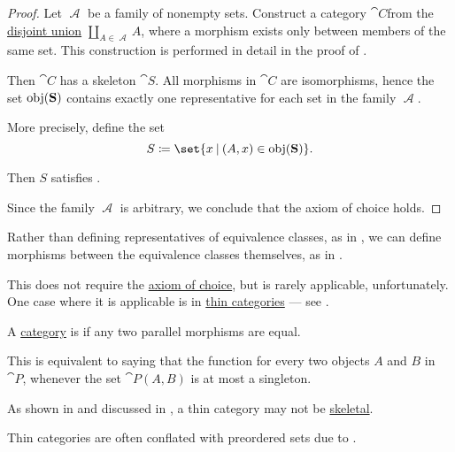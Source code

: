 \begin{proof}
  Let \( \mscrA \) be a family of nonempty sets. Construct a category \( \cat{C} \)from the \hyperref[def:disjoint_union]{disjoint union} \( \coprod_{A \in \mscrA} A \), where a morphism exists only between members of the same set. This construction is performed in detail in the proof of .

  Then \( \cat{C} \) has a skeleton \( \cat{S} \). All morphisms in \( \cat{C} \) are isomorphisms, hence the set \( \operatorname{obj}(\operatorname{\mathbf{S}}) \) contains exactly one representative for each set in the family \( \mscrA \).

  More precisely, define the set
  \begin{equation*}
    S \coloneqq \set{ x \given (A, x) \in \obj(\cat{S}) }.
  \end{equation*}

  Then \( S \) satisfies .

  Since the family \( \mscrA \) is arbitrary, we conclude that the axiom of choice holds.
\end{proof}

\begin{remark}\label{rem:skeletons_and_thin_categories}
  Rather than defining representatives of equivalence classes, as in , we can define morphisms between the equivalence classes themselves, as in .

  This does not require the \hyperref[def:zfc/choice]{axiom of choice}, but is rarely applicable, unfortunately. One case where it is applicable is in \hyperref[def:thin_category]{thin categories} --- see .
\end{remark}

\begin{definition}\label{def:thin_category}
  A \hyperref[def:category]{category} is  if any two parallel morphisms are equal.

  This is equivalent to saying that the function for every two objects \( A \) and \( B \) in \( \cat{P} \), whenever the set \( \cat{P}(A, B) \) is at most a singleton.

  As shown in  and discussed in , a thin category may not be \hyperref[def:skeletal_category]{skeletal}.

  Thin categories are often conflated with preordered sets due to .
\end{definition}

